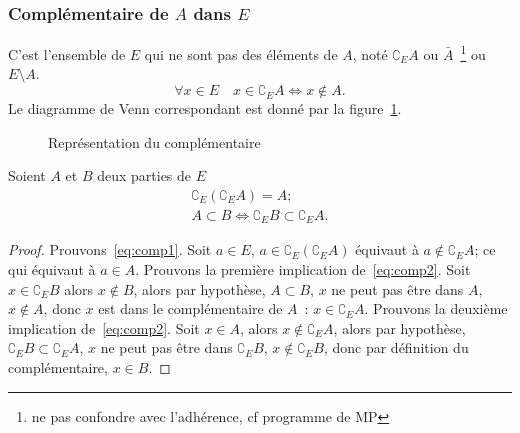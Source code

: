 \subsubsection{Complémentaire de \(A\) dans \(E\)}\label{chap3-subsubsec:complementaire}

C'est l'ensemble de \(E\) qui ne sont pas des éléments de \(A\), noté
\(\complement_E A\) ou \(\bar{A}\)~\footnote{ne pas confondre avec l'adhérence,
cf programme de MP} ou \(E \setminus A\).
\begin{equation}
  \forall{}x \in{}E \quad x \in{}\complement_E A \iff{}x \not\in{}A.
\end{equation}
Le diagramme de Venn correspondant est donné par la figure~\ref{chap3-fig:comp}.

\begin{figure}[p]
  \centering
  \caption{Représentation du complémentaire}\label{chap3-fig:comp}
\end{figure}

\begin{prop}
  Soient \(A\) et \(B\) deux parties de \(E\)
  \begin{gather}
    \complement_E (\complement_E A) = A; \label{eq:comp1}\\
    A \subset{}B \iff{}\complement_E B \subset{}\complement_E A. \label{eq:comp2}
  \end{gather}
\end{prop}

\begin{proof}
  Prouvons~\eqref{eq:comp1}. Soit \(a \in{}E\), \(a \in{}\complement_E
  (\complement_E A)\) équivaut à \(a \not\in{}\complement_E A\); ce qui équivaut à
  \(a \in{}A\). Prouvons la première implication de~\eqref{eq:comp2}. Soit \(x \in{}
  \complement_E B\) alors \(x \not\in{}B\), alors par hypothèse, \(A \subset{}B\),
  \(x\) ne peut pas être dans \(A\), \(x \not\in{}A\), donc \(x\) est dans le
  complémentaire de \(A\)~: \(x \in{}\complement_E A\).
  Prouvons la deuxième implication de~\eqref{eq:comp2}. Soit \(x \in{}A\), alors
  \(x \not\in{}\complement_E A\), alors par hypothèse, \(\complement_E B \subset{}
  \complement_E A\), \(x\) ne peut pas être dans \(\complement_E B\), \(x \not\in{}
  \complement_E B\), donc par définition du complémentaire, \(x \in{}B\).
\end{proof}

